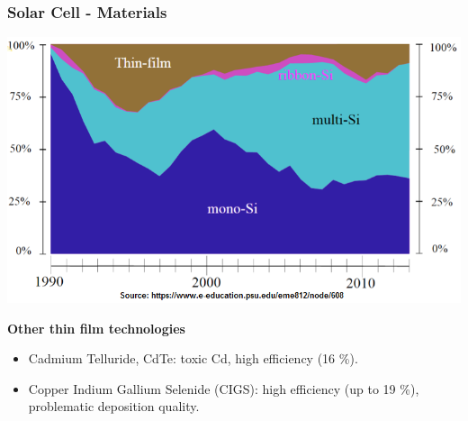 \documentclass{beamer}
\begin{document}
	\begin{frame}
    \frametitle{Solar Cell - Materials}
		\begin{center}
			\includegraphics[scale=0.4]{obr04_vyvoj.png}
		\end{center}
		\textbf{Other thin film technologies}	
		\small
		\begin{itemize}
			\item Cadmium Telluride, CdTe: toxic Cd, high efficiency (16 \%).
			\item Copper Indium Gallium Selenide (CIGS): high efficiency (up to 19 \%), problematic deposition quality.
		\end{itemize}
	\end{frame}
\end{document}

